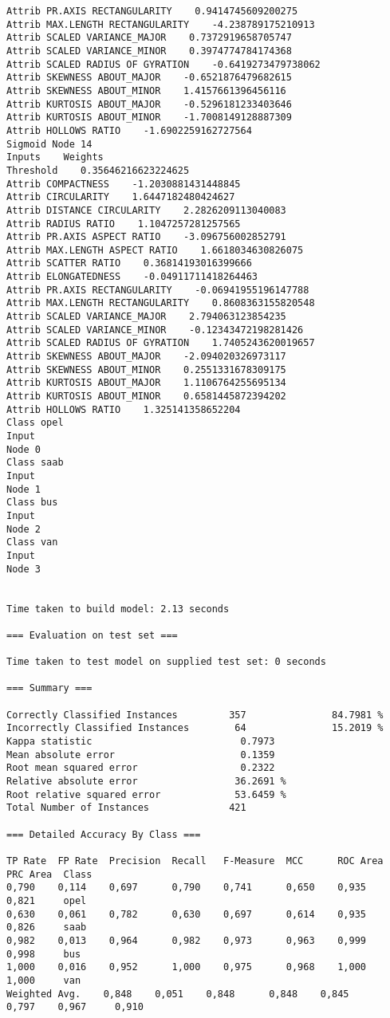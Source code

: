 \documentclass[
	article,			%
	11pt,				%
	oneside,			%
	a4paper,			%
	english,			%
	brazil,				%
	sumario=tradicional
	]{abntex2}
\begin{document}
\begin{lstlisting}
Attrib PR.AXIS RECTANGULARITY    0.9414745609200275
Attrib MAX.LENGTH RECTANGULARITY    -4.238789175210913
Attrib SCALED VARIANCE_MAJOR    0.7372919658705747
Attrib SCALED VARIANCE_MINOR    0.3974774784174368
Attrib SCALED RADIUS OF GYRATION    -0.6419273479738062
Attrib SKEWNESS ABOUT_MAJOR    -0.6521876479682615
Attrib SKEWNESS ABOUT_MINOR    1.4157661396456116
Attrib KURTOSIS ABOUT_MAJOR    -0.5296181233403646
Attrib KURTOSIS ABOUT_MINOR    -1.7008149128887309
Attrib HOLLOWS RATIO    -1.6902259162727564
Sigmoid Node 14
Inputs    Weights
Threshold    0.35646216623224625
Attrib COMPACTNESS    -1.2030881431448845
Attrib CIRCULARITY    1.6447182480424627
Attrib DISTANCE CIRCULARITY    2.2826209113040083
Attrib RADIUS RATIO    1.1047257281257565
Attrib PR.AXIS ASPECT RATIO    -3.096756002852791
Attrib MAX.LENGTH ASPECT RATIO    1.6618034630826075
Attrib SCATTER RATIO    0.36814193016399666
Attrib ELONGATEDNESS    -0.04911711418264463
Attrib PR.AXIS RECTANGULARITY    -0.06941955196147788
Attrib MAX.LENGTH RECTANGULARITY    0.8608363155820548
Attrib SCALED VARIANCE_MAJOR    2.794063123854235
Attrib SCALED VARIANCE_MINOR    -0.12343472198281426
Attrib SCALED RADIUS OF GYRATION    1.7405243620019657
Attrib SKEWNESS ABOUT_MAJOR    -2.094020326973117
Attrib SKEWNESS ABOUT_MINOR    0.2551331678309175
Attrib KURTOSIS ABOUT_MAJOR    1.1106764255695134
Attrib KURTOSIS ABOUT_MINOR    0.6581445872394202
Attrib HOLLOWS RATIO    1.325141358652204
Class opel
Input
Node 0
Class saab
Input
Node 1
Class bus
Input
Node 2
Class van
Input
Node 3


Time taken to build model: 2.13 seconds

=== Evaluation on test set ===

Time taken to test model on supplied test set: 0 seconds

=== Summary ===

Correctly Classified Instances         357               84.7981 %
Incorrectly Classified Instances        64               15.2019 %
Kappa statistic                          0.7973
Mean absolute error                      0.1359
Root mean squared error                  0.2322
Relative absolute error                 36.2691 %
Root relative squared error             53.6459 %
Total Number of Instances              421     

=== Detailed Accuracy By Class ===

TP Rate  FP Rate  Precision  Recall   F-Measure  MCC      ROC Area  PRC Area  Class
0,790    0,114    0,697      0,790    0,741      0,650    0,935     0,821     opel
0,630    0,061    0,782      0,630    0,697      0,614    0,935     0,826     saab
0,982    0,013    0,964      0,982    0,973      0,963    0,999     0,998     bus
1,000    0,016    0,952      1,000    0,975      0,968    1,000     1,000     van
Weighted Avg.    0,848    0,051    0,848      0,848    0,845      0,797    0,967     0,910     


\end{lstlisting}
\end{document}
